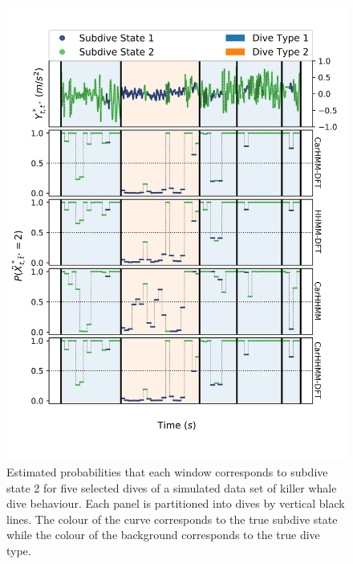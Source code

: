 \begin{figure}[ht]
    \centering
    \includegraphics[width=4.5in]{../Plots/Posterior_Fine_States.png}
    \caption{Estimated probabilities that each window corresponds to subdive state 2 for five selected dives of a simulated data set of killer whale dive behaviour. Each panel is partitioned into dives by vertical black lines. The colour of the curve corresponds to the true subdive state while the colour of the background corresponds to the true dive type.}
    \label{fig:acc_fine}
\end{figure}